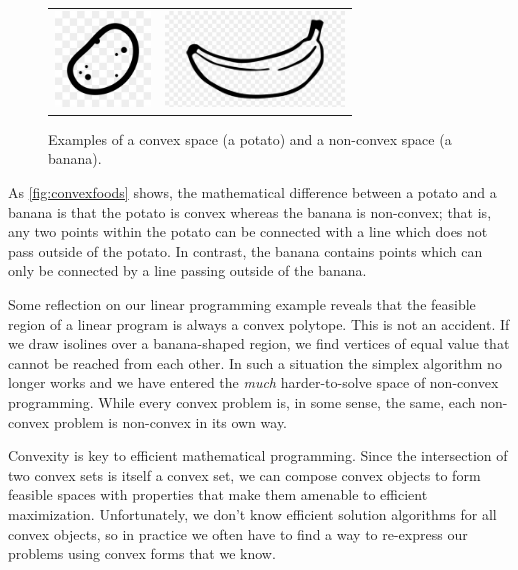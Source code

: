 \documentclass{article}
\begin{document}
\begin{figure}
\centering
\begin{tabular}{cc}
\includegraphics[height=1in]{imgs/potato.jpg} &
\includegraphics[height=1in]{imgs/banana.png}
\end{tabular}
\caption{Examples of a convex space (a potato) and a non-convex space (a banana).\label{fig:convexfoods}}
\end{figure}

As \autoref{fig:convexfoods} shows, the mathematical difference between a potato and a banana is that the potato is convex whereas the banana is non-convex; that is, any two points within the potato can be connected with a line which does not pass outside of the potato. In contrast, the banana contains points which can only be connected by a line passing outside of the banana.

Some reflection on our linear programming example reveals that the feasible region of a linear program is always a convex polytope. This is not an accident. If we draw isolines over a banana-shaped region, we find vertices of equal value that cannot be reached from each other. In such a situation the simplex algorithm no longer works and we have entered the \textit{much} harder-to-solve space of non-convex programming. While every convex problem is, in some sense, the same, each non-convex problem is non-convex in its own way. %

Convexity is key to efficient mathematical programming. Since the intersection of two convex sets is itself a convex set, we can compose convex objects to form feasible spaces with properties that make them amenable to efficient maximization. Unfortunately, we don't know efficient solution algorithms for all convex objects, so in practice we often have to find a way to re-express our problems using convex forms that we know.
\end{document}

